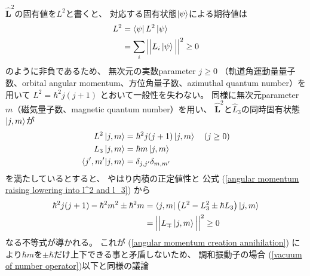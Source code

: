 $\hat{\bm{L}}^2$の固有値を$L^2$と書くと、
対応する固有状態$\ket{\psi}$による期待値は
\begin{align}
    L^2
&=
    \bra{\psi} L^2 \ket{\psi}
\notag\\&=
    \sum_i
    \Big|\Big|
        L_i \ket{\psi}
    \Big|\Big|^2 \ge 0
\end{align}
のように非負であるため、
無次元の実数parameter $j \ge 0$
（軌道角運動量量子数、orbital angular momentum、方位角量子数、azimuthal quantum number）を用いて
$L^2 = \hbar^2 j (j+1)$
とおいて一般性を失わない。
同様に無次元parameter $m$（磁気量子数、magnetic quantum number）を用い、
$\hat{\bm{L}}^2$と$\hat{L}_3$の同時固有状態$\ket{j,m}$が
\begin{subequations}
\begin{align}
    L^2 \ket{j,m}
    &=
    \hbar^2 j (j+1) \ket{j,m}
    \quad( j \ge 0 )
\\
    L_3 \ket{j,m}
    &=
    \hbar m \ket{j,m}
\\
    \braket{ j', m' | j, m }
    &=
    \delta_{j, j'} \delta_{m, m'}
\end{align}
\end{subequations}
を満たしているとすると、
やはり内積の正定値性と
公式
(\ref{angular momentum raising lowering into l^2 and l_3})
から
\begin{align}
    \hbar^2 j (j+1)
-
    \hbar^2 m^2
\pm \hbar^2 m
&=
    \bra{ j, m } \left(
        L^2
        -
        L_3^2
        \pm \hbar
        L_3
    \right)\ket{ j, m }
\notag\\&=
    \Big|\Big|
        L_\mp \ket{ j, m }
    \Big|\Big|^2
\ge
    0
\label{positive definiteness of angular momentuum}
\end{align}
なる不等式が導かれる。
これが
(\ref{angular momentum creation annihilation})
により$\hbar m$を$\pm \hbar$だけ上下できる事と矛盾しないため、
調和振動子の場合
(\ref{vacuum of number operator})以下と同様の議論
